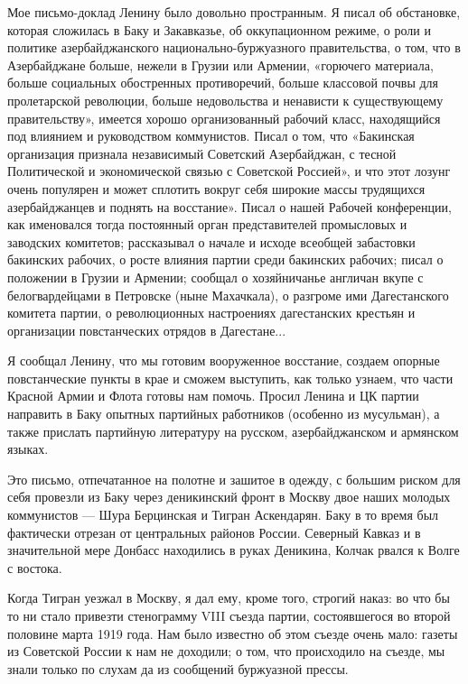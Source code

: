 \documentclass[12pt, a4paper, openany]{book}
\begin{document}
Мое письмо-доклад Ленину было довольно пространным. Я писал об обстановке, которая сложилась в Баку и Закавказье, об оккупационном режиме, о роли и политике азербайджанского национально-буржуазного правительства, о том, что в Азербайджане больше, нежели в Грузии или Армении, «горючего материала, больше социальных обостренных противоречий, больше классовой почвы для пролетарской революции, больше недовольства и ненависти к существующему правительству», имеется хорошо организованный рабочий класс, находящийся под влиянием и руководством коммунистов. Писал о том, что «Бакинская организация признала независимый Советский Азербайджан, с тесной Политической и экономической связью с Советской Россией», и что этот лозунг очень популярен и может сплотить вокруг себя широкие массы трудящихся азербайджанцев и поднять на восстание». Писал о нашей Рабочей конференции, как именовался тогда постоянный орган представителей промысловых и заводских комитетов; рассказывал о начале и исходе всеобщей забастовки бакинских рабочих, о росте влияния партии среди бакинских рабочих; писал о положении в Грузии и Армении; сообщал о хозяйничанье англичан вкупе с белогвардейцами в Петровске (ныне Махачкала), о разгроме ими Дагестанского комитета партии, о революционных настроениях дагестанских крестьян и организации повстанческих отрядов в Дагестане...

Я сообщал Ленину, что мы готовим вооруженное восстание, создаем опорные повстанческие пункты в крае и сможем выступить, как только узнаем, что части Красной Армии и Флота готовы нам помочь. Просил Ленина и ЦК партии направить в Баку опытных партийных работников (особенно из мусульман), а также прислать партийную литературу на русском, азербайджанском и армянском языках.

Это письмо, отпечатанное на полотне и зашитое в одежду, с большим риском для себя провезли из Баку через деникинский фронт в Москву двое наших молодых коммунистов — Шура Берцинская и Тигран Аскендарян. Баку в то время был фактически отрезан от центральных районов России. Северный Кавказ и в значительной мере Донбасс находились в руках Деникина, Колчак рвался к Волге с востока.

Когда Тигран уезжал в Москву, я дал ему, кроме того, строгий наказ: во что бы то ни стало привезти стенограмму VIII съезда партии, состоявшегося во второй половине марта 1919 года. Нам было известно об этом съезде очень мало: газеты из Советской России к нам не доходили; о том, что происходило на съезде, мы знали только по слухам да из сообщений буржуазной прессы.
\end{document}
